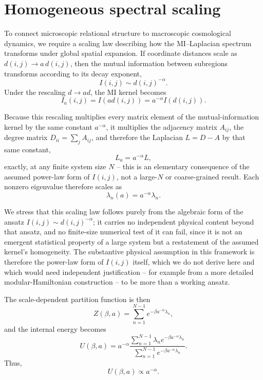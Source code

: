 \documentclass[aps,prd,onecolumn,nofootinbib,preprint]{revtex4-2}
\begin{document}
\section{Homogeneous spectral scaling}
\label{sec:scaling}

To connect microscopic relational structure to macroscopic cosmological dynamics, we require a
scaling law describing how the MI--Laplacian spectrum transforms under global spatial expansion.
If coordinate distances scale as $d(i,j) \rightarrow a\, d(i,j)$, then the mutual information between
subregions transforms according to its decay exponent,
\begin{equation}
I(i,j) \sim d(i,j)^{-\alpha}.
\end{equation}
Under the rescaling $d \rightarrow a d$, the MI kernel becomes
\begin{equation}
I_a(i,j) = I(ad(i,j)) = a^{-\alpha} I(d(i,j)).
\end{equation}

Because this rescaling multiplies every matrix element of the mutual-information kernel by the
same constant $a^{-\alpha}$, it multiplies the adjacency matrix $A_{ij}$, the degree matrix
$D_{ii} = \sum_j A_{ij}$, and therefore the Laplacian $L = D - A$ by that same constant,
\begin{equation}
L_a = a^{-\alpha} L,
\end{equation}
exactly, at any finite system size $N$ -- this is an elementary consequence of the assumed
power-law form of $I(i,j)$, not a large-$N$ or coarse-grained result. Each nonzero eigenvalue
therefore scales as
\begin{equation}
\lambda_n(a) = a^{-\alpha} \lambda_n.
\end{equation}

We stress that this scaling law follows purely from the algebraic form of the ansatz
$I(i,j) \sim d(i,j)^{-\alpha}$; it carries no independent physical content beyond that ansatz, and no
finite-size numerical test of it can fail, since it is not an emergent statistical property of a
large system but a restatement of the assumed kernel's homogeneity. The substantive physical
assumption in this framework is therefore the power-law form of $I(i,j)$ itself, which we do not
derive here and which would need independent justification -- for example from a more detailed
modular-Hamiltonian construction -- to be more than a working ansatz.

The scale-dependent partition function is then
\begin{equation}
Z(\beta,a) = \sum_{n=1}^{N-1} e^{-\beta a^{-\alpha} \lambda_n},
\end{equation}
and the internal energy becomes
\begin{equation}
U(\beta,a)
= a^{-\alpha}
\frac{\sum_{n=1}^{N-1} \lambda_n e^{-\beta a^{-\alpha} \lambda_n}}
     {\sum_{n=1}^{N-1} e^{-\beta a^{-\alpha} \lambda_n}}.
\end{equation}
Thus,
\begin{equation}
U(\beta,a) \propto a^{-\alpha}.
\end{equation}
\end{document}

